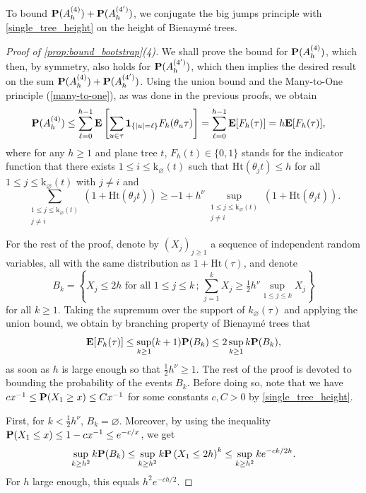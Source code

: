 \documentclass[11pt,reqno]{amsart}
\newcommand{\Ht}{\mathrm{Ht}}
\newcommand{\rk}{\mathrm{k}}
\renewcommand{\emptyset}{\varnothing}
\begin{document}
To bound $\mathbf{P}(A_h^{(4)})+\mathbf{P}(A_{h}^{(4')})$, we conjugate the big jumps principle with \cref{single_tree_height} on the height of Bienaymé trees.

\begin{proof}[Proof of \cref{prop:bound_bootstrap}(4)]
    We shall prove the bound for $\mathbf{P}(A_{h}^{(4)})$, which then, by symmetry, also holds for $\mathbf{P}(A_{h}^{(4')})$, which then implies the desired result on the sum $\mathbf{P}(A_{h}^{(4)})+\mathbf{P}(A_{h}^{(4')})$.
    Using the union bound and the Many-to-One principle (\cref{many-to-one}), as was done in the previous proofs, we obtain
    \begin{align*}
        \mathbf{P}(A_{h}^{(4)}) &\leq \sum_{\ell=0}^{h-1} \mathbf{E}\left[ \sum_{u \in \tau}{\mathbf 1}_{\left\{|u| = \ell\right\}} F_h(\theta_u \tau) \right] =  \sum_{\ell=0}^{h-1} {\mathbf E}[F_h(\tau)] = h{\mathbf E}[F_h(\tau)],
    \end{align*}
    where for any $h\geq 1$ and plane tree $t$, $F_h(t)\in\{0,1\}$ stands for the indicator function that there exists $1\leq i\leq \rk_\varnothing(t)$ such that $\Ht(\theta_j t)\leq h$ for all $1\leq j\leq \rk_\varnothing(t)$ with $j\neq i$ and
    \[\sum_{\substack{1\leq j\leq \rk_\varnothing(t) \\ j\neq i}}(1+\Ht(\theta_j t))\geq -1+h^\nu\sup_{\substack{1\leq j\leq \rk_\varnothing(t) \\ j\neq i}}(1+\Ht(\theta_j t)).\]
    
    For the rest of the proof, denote by $(X_j)_{j\geq 1}$ a sequence of independent random variables, all with the same distribution as $1+\Ht(\tau)$, and denote
    \[B_k = \left\{ X_j \leq 2h \text{ for all $1\leq j\leq k$}\, ;\, \sum_{j=1}^{k} X_j \geq \tfrac{1}{2} h^\nu \sup_{1 \leq j \leq k} X_j \right\}\]
    for all $k\geq 1$. Taking the supremum over the support of $k_\emptyset(\tau)$ and applying the union bound, we obtain by branching property of Bienaymé trees that
    \[{\mathbf E}[F_h(\tau)]\leq \sup_{k \geq 1} (k+1)\mathbf{P}(B_k) \leq 2\sup_{k \geq 1} k\mathbf{P}(B_k),\]
    as soon as $h$ is large enough so that $\tfrac{1}{2}h^\nu\geq 1$. The rest of the proof is devoted to bounding the probability of the events $B_k$. Before doing so, note that we have $cx^{-1} \leq \mathbf{P}(X_1 \geq x) \leq Cx^{-1}$ for some constants $c,C > 0$ by \cref{single_tree_height}.
    
     First, for $k<\tfrac{1}{2}h^\nu$, $B_k=\emptyset$. 
     Moreover, by using the inequality $\mathbf{P}(X_1\le x)\le 1-c x^{-1}\le e^{-c/x}$, we get 
    \[\sup_{k\ge h^{2}} k \mathbf{P}(B_k)\le  \sup_{k\ge h^{2}} k \mathbf{P}\left(X_1\le 2h\right)^k \le \sup_{k\ge h^{2}} k e^{-c k/2h}.\] 
    For $h$ large enough, this equals $h^{2}e^{-c h/2}$. 
    

\end{proof}
\end{document}
